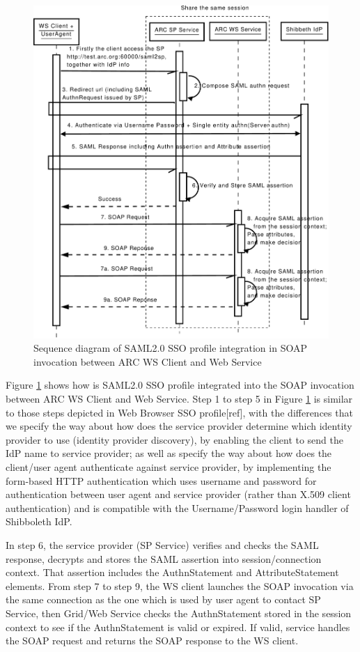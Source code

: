 \documentclass[conference]{IEEEtran}
\begin{document}
\begin{figure}
\includegraphics[width=1.0\columnwidth]{SAML2SSO_UML.pdf}
\caption{Sequence diagram of SAML2.0 SSO profile integration in SOAP invocation 
between ARC WS Client and Web Service}
\label{fig:SAML2SSOUML}
\end{figure}

Figure \ref{fig:SAML2SSOUML} shows how is SAML2.0 SSO profile integrated into the SOAP 
invocation between ARC WS Client and Web Service. Step 1 to step 5 in Figure \ref{fig:SAML2SSOUML} 
is similar to those steps depicted in Web Browser SSO profile[ref], with the differences that
we specify the way about how does the service provider determine which identity provider to use (identity
provider discovery), by enabling the client to send the IdP name to service provider; as well 
as specify the way about how does the client/user agent authenticate against service provider, 
by implementing the form-based HTTP authentication which uses username and password for authentication between 
user agent and service provider (rather than X.509 client authentication) and is compatible 
with the Username/Password login handler of Shibboleth IdP.

In step 6, the service provider (SP Service) verifies and checks the SAML response, decrypts and stores 
the SAML assertion into session/connection context. That assertion includes the AuthnStatement and 
AttributeStatement elements. From step 7 to step 9, the WS client launches the SOAP invocation via 
the same connection as the one which is used by user agent to contact SP Service, then Grid/Web Service 
checks the AuthnStatement stored in the session context to see if the AuthnStatement is valid or expired. 
If valid, service handles the SOAP request and returns the SOAP response to the WS client.
\end{document}
